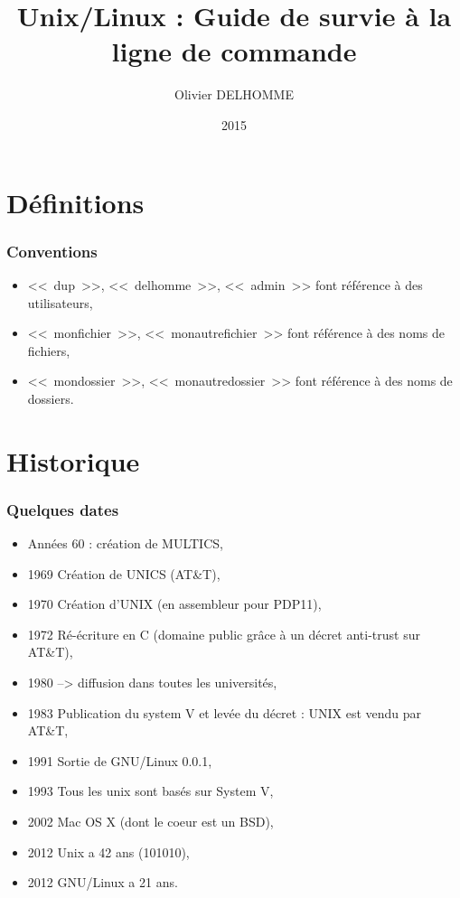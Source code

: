 \documentclass[handout,10pt]{beamer}
\title{Unix/Linux : Guide de survie à la ligne de commande}
\author{Olivier DELHOMME}
\date{2015}
\begin{document}
\normalfont\normalfont

\frame
{
    \titlepage
    \begin{center}
    \end{center}
}


\section{Définitions}
\frame
{
    \frametitle{Conventions}

    \begin{itemize}
        \item {\ttfamily <<~dup~>>, <<~delhomme~>>, <<~admin~>>} font référence à des utilisateurs,
        \item {\ttfamily <<~monfichier~>>, <<~monautrefichier~>>} font référence à des noms de fichiers,
        \item {\ttfamily <<~mondossier~>>, <<~monautredossier~>>} font référence à des noms de dossiers.
    \end{itemize}
}


\section{Historique}
\frame
{
    \frametitle{Quelques dates}

     \begin{itemize}
        \item Années 60 : création de MULTICS,
        \item 1969 Création de UNICS (AT\&T),
        \item 1970 Création d'UNIX (en assembleur pour PDP11),
        \item 1972 Ré-écriture en C (domaine public grâce à un décret anti-trust sur AT\&T),
        \item 1980 --> diffusion dans toutes les universités,
        \item 1983 Publication du system V et levée du décret : UNIX est vendu par AT\&T,
        \item 1991 Sortie de GNU/Linux 0.0.1,
        \item 1993 Tous les unix sont basés sur System V,
        \item 2002 Mac OS X (dont le coeur est un BSD),
        \item 2012 Unix a 42 ans (101010),
        \item 2012 GNU/Linux a 21 ans.
    \end{itemize}
}
\end{document}
